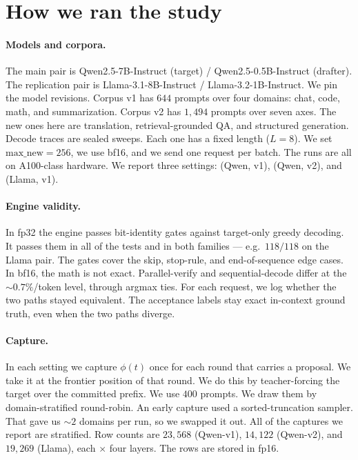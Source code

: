 \documentclass[11pt]{article}
\begin{document}
\section{How we ran the study}
\label{sec:protocol}

\paragraph{Models and corpora.} The main pair is Qwen2.5-7B-Instruct (target) /
Qwen2.5-0.5B-Instruct (drafter). The replication pair is
Llama-3.1-8B-Instruct / Llama-3.2-1B-Instruct. We pin the model revisions.
Corpus v1 has $644$ prompts over four domains: chat, code, math, and
summarization. Corpus v2 has $1{,}494$ prompts over seven axes. The new ones
here are translation, retrieval-grounded QA, and structured generation. Decode
traces are sealed sweeps. Each one has a fixed length ($L{=}8$). We set
$\mathrm{max\_new}=256$, we use bf16, and we send one request per batch. The
runs are all on A100-class hardware. We report three settings: (Qwen, v1),
(Qwen, v2), and (Llama, v1).

\paragraph{Engine validity.} In fp32 the engine passes bit-identity gates
against target-only greedy decoding. It passes them in all of the tests and in
both families --- e.g.\ $118/118$ on the Llama pair. The gates cover the skip,
stop-rule, and end-of-sequence edge cases. In bf16, the math is not exact.
Parallel-verify and sequential-decode differ at the ${\sim}0.7\%$/token level,
through argmax ties. For each request, we log whether the two paths stayed
equivalent. The acceptance labels stay exact in-context ground truth, even
when the two paths diverge.

\paragraph{Capture.} In each setting we capture $\phi(t)$ once for each round
that carries a proposal. We take it at the frontier position of that round. We
do this by teacher-forcing the target over the committed prefix. We use $400$
prompts. We draw them by domain-stratified round-robin. An early capture used
a sorted-truncation sampler. That gave us ${\sim}2$ domains per run, so we
swapped it out. All of the captures we report are stratified. Row counts are
$23{,}568$ (Qwen-v1), $14{,}122$ (Qwen-v2), and $19{,}269$ (Llama), each
$\times$ four layers. The rows are stored in fp16.
\end{document}
